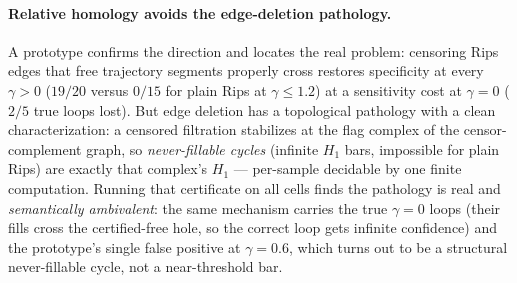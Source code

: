 \documentclass[11pt]{article}
\theoremstyle{remark}
\begin{document}
\paragraph{Relative homology avoids the edge-deletion pathology.} A
prototype confirms the direction and locates the real problem: censoring
Rips edges that free trajectory segments properly cross restores
specificity at every $\gamma > 0$ ($19/20$ versus $0/15$ for plain Rips at
$\gamma \le 1.2$) at a sensitivity cost at $\gamma = 0$ ($2/5$ true
loops lost). But edge deletion has a topological pathology with a clean
characterization: a censored filtration stabilizes at the flag complex
of the censor-complement graph, so \emph{never-fillable cycles}
(infinite $H_1$ bars, impossible for plain Rips) are exactly that
complex's $H_1$ --- per-sample decidable by one finite computation.
Running that certificate on all cells finds the pathology is real and
\emph{semantically ambivalent}: the same mechanism carries the true
$\gamma = 0$ loops (their fills cross the certified-free hole, so the
correct loop gets infinite confidence) and the prototype's single false
positive at $\gamma = 0.6$, which turns out to be a structural
never-fillable cycle, not a near-threshold bar.
\end{document}

